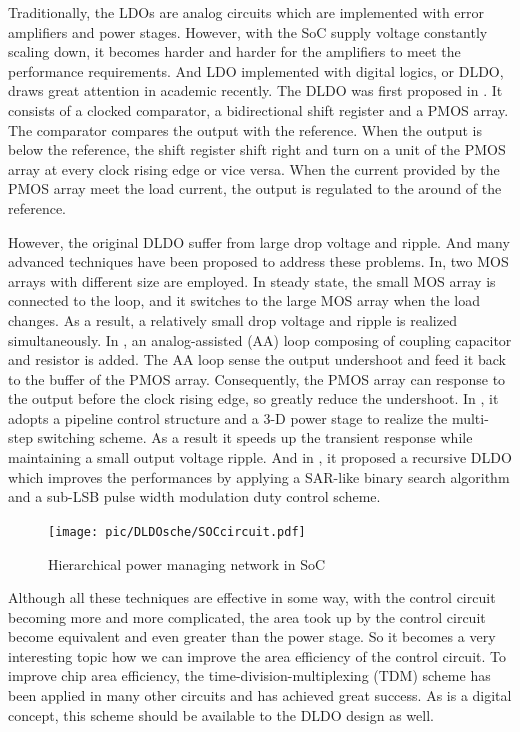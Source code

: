 \documentclass[journal]{IEEEtran}
\begin{document}
Traditionally, the LDOs are analog circuits which are implemented with error amplifiers and power stages. However, with the SoC supply voltage constantly scaling down, it becomes harder and harder for the amplifiers to meet the performance requirements. And LDO implemented with digital logics, or DLDO, draws great attention in academic recently. The DLDO was first proposed in \cite{original}. It consists of a clocked comparator, a bidirectional shift register and a PMOS array. The comparator compares the output with the reference. When the output is below the reference, the shift register shift right and turn on a unit of the PMOS array at every clock rising edge or vice versa. When the current provided by the PMOS array meet the load current, the output is regulated to the around of the reference.

However, the original DLDO suffer from large drop voltage and ripple. And many advanced techniques have been proposed to address these problems. In\cite{coarse-fine}, two MOS arrays with different size are employed. In steady state, the small MOS array is connected to the loop, and it switches to the large MOS array when the load changes. As a result, a relatively small drop voltage and ripple is realized simultaneously. In \cite{AALDO,NANDbasedAAloop}, an analog-assisted (AA) loop composing of coupling capacitor and resistor is added. The AA loop sense the output undershoot and feed it back to the buffer of the PMOS array. Consequently, the PMOS array can response to the output before the clock rising edge, so greatly reduce the undershoot. In \cite{pipeline}, it adopts a pipeline control structure and a 3-D power stage to realize the multi-step switching scheme. As a result it speeds up the transient response while maintaining a small output voltage ripple. And in \cite{recursive}, it proposed a recursive DLDO which improves the performances by applying a SAR-like binary search algorithm and a sub-LSB pulse width modulation duty control scheme. 
\begin{figure}[t!]
    \centering
    \texttt{[image: pic/DLDOsche/SOCcircuit.pdf]}
    \caption{Hierarchical power managing network in SoC}
    \label{hierarchical}
\end{figure}

Although all these techniques are effective in some way, with the control circuit becoming more and more complicated, the area took up by the control circuit become equivalent and even greater than the power stage. So it becomes a very interesting topic how we can improve the area efficiency of the control circuit. To improve chip area efficiency, the time-division-multiplexing (TDM) scheme has been applied in many other circuits and has achieved great success. As is a digital concept, this scheme should be available to the DLDO design as well.
\end{document}

